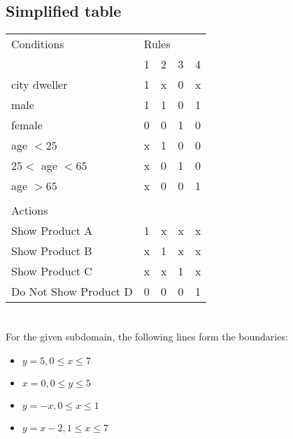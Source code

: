 \documentclass[letterpaper]{article}
\begin{document}
\subsection{Simplified table}
\begin{adjustbox}{center}
	\begin{tabularx}{\textwidth}{lllll}
		Conditions            & \multicolumn{4}{l}{Rules}             \\
		                      & 1                         & 2 & 3 & 4 \\ \cline{2-5}
		city dweller          & 1                         & x & 0 & x \\
		male                  & 1                         & 1 & 0 & 1 \\
		female                & 0                         & 0 & 1 & 0 \\
		age $<25$             & x                         & 1 & 0 & 0 \\
		$25<$ age $<65$       & x                         & 0 & 1 & 0 \\
		age $>65$             & x                         & 0 & 0 & 1 \\
		                      &                           &   &   &   \\
		Actions               &                           &   &   &   \\ \cline{1-1}
		Show Product A        & 1                         & x & x & x \\
		Show Product B        & x                         & 1 & x & x \\
		Show Product C        & x                         & x & 1 & x \\
		Do Not Show Product D & 0                         & 0 & 0 & 1 \\
	\end{tabularx}%
\end{adjustbox}

\section{}
For the given subdomain, the following lines form the boundaries:
\begin{itemize}
	\item $y=5, 0\leq x\leq 7$
	\item $x=0, 0\leq y \leq 5$
	\item $y=-x, 0\leq x\leq 1$
	\item $y=x-2, 1\leq x \leq 7$
\end{itemize}
\end{document}
